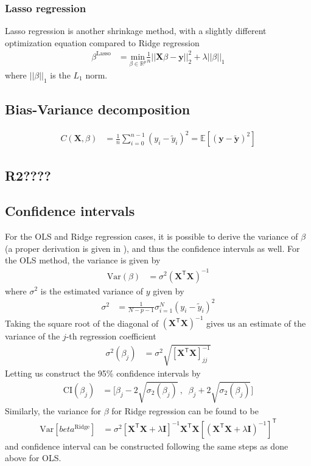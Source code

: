 \documentclass{article}
\newcommand{\XX}{\mathbf{X}}
\newcommand{\II}{\textbf{I}}
\newcommand{\T}{\mathsf{T}}
\begin{document}
\subsubsection{Lasso regression}
Lasso regression is another shrinkage method, with a slightly different optimization equation compared to Ridge regression
\begin{align*}
	\beta^{\text{Lasso}} &= \underset{\beta\in \mathbb{R}^{p}}{\text{min}}\frac{1}{n}||\bm{X}\beta - \bm{y}||^2_2 + \lambda||\beta||_1
\end{align*}
where $||\beta||_1$ is the $L_{1}$ norm.
\subsection{Bias-Variance decomposition}
\begin{align*}
	C(\XX, \beta) &= \frac{1}{n}\sum_{i=0}^{n-1}(y_i-\tilde y_i)^2 = \mathbb{E}[(\bm{y}-\bm{\tilde y})^2]
\end{align*}
\subsection{R2????}
\subsection{Confidence intervals}
For the OLS and Ridge regression cases, it is possible to derive the variance of $\beta$ (a proper derivation is given in \cite{vanwieringen2020lecture}), and thus the confidence intervals as well. For the OLS method, the variance is given by
\begin{align*}
	\text{Var}(\beta) &= \sigma^2(\XX^\T\XX)^{-1}
\end{align*}
where $\sigma^2$ is the estimated variance of $y$ given by %
\begin{align*}
	\sigma^2 &= \frac{1}{N-p-1}\sigma_{i=1}^N(y_i-\tilde y_i)^2
\end{align*}
Taking the square root of the diagonal of $(\XX^\T\XX)^{-1}$ gives us an estimate of the variance of the $j$-th regression coefficient
\begin{align*}
	\sigma^2(\beta_j) &= \sigma^2\sqrt{[\XX^\T\XX]^{-1}_{jj}}
\end{align*}
Letting us construct the 95\% confidence intervals by
\begin{align*}
	\text{CI}(\beta_j) &= \bigg[\beta_j - 2\sqrt{\sigma_2(\beta_j)}\:,\;\; \beta_j + 2\sqrt{\sigma_2(\beta_j)}\bigg]
\end{align*}
Similarly, the variance for $\beta$ for Ridge regression can be found to be
\begin{align*}
\text{Var}[beta^{\text{Ridge}}] &= \sigma^2[\XX^\T\XX + \lambda\II]^{-1}
\XX^\T \XX[(\XX^\T \XX + \lambda \II)^{-1}]^\T
\end{align*}
and confidence interval can be constructed following the same steps as done above for OLS.%
\end{document}
